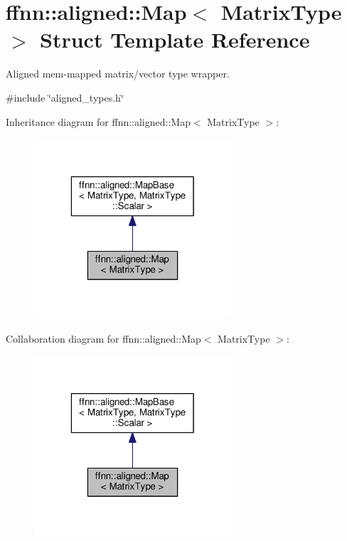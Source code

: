 \hypertarget{structffnn_1_1aligned_1_1_map}{\section{ffnn\-:\-:aligned\-:\-:Map$<$ Matrix\-Type $>$ Struct Template Reference}
\label{structffnn_1_1aligned_1_1_map}
}


Aligned mem-\/mapped matrix/vector type wrapper.  




{\ttfamily \#include \char`\"{}aligned\-\_\-types.\-h\char`\"{}}



Inheritance diagram for ffnn\-:\-:aligned\-:\-:Map$<$ Matrix\-Type $>$\-:\nopagebreak
\begin{figure}[H]
\begin{center}
\leavevmode
\includegraphics[width=208pt]{structffnn_1_1aligned_1_1_map__inherit__graph}
\end{center}
\end{figure}


Collaboration diagram for ffnn\-:\-:aligned\-:\-:Map$<$ Matrix\-Type $>$\-:\nopagebreak
\begin{figure}[H]
\begin{center}
\leavevmode
\includegraphics[width=208pt]{structffnn_1_1aligned_1_1_map__coll__graph}
\end{center}
\end{figure}
